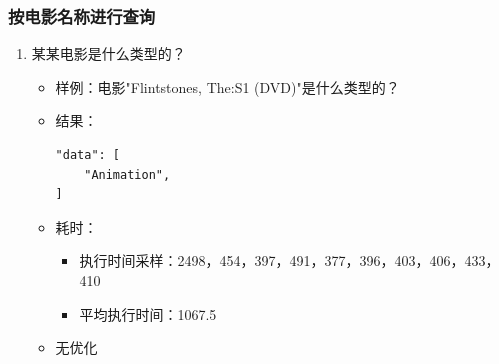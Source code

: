 \documentclass{ctexrep}
\begin{document}
	\subsubsection{按电影名称进行查询}
	    \begin{enumerate}
	        \item 某某电影是什么类型的？
    	        \begin{itemize}
    	            \item 样例：电影"Flintstones, The:S1 (DVD)"是什么类型的？
    	            \item 结果：
    	                \begin{lstlisting}
"data": [
	"Animation",
]
    	                \end{lstlisting}
					\item 耗时：
					\begin{itemize}
						\item 执行时间采样：2498，454，397，491，377，396，403，406，433，410
						\item 平均执行时间：1067.5
					\end{itemize}
				\item 无优化
				\end{itemize}
		\end{enumerate}
\end{document}
